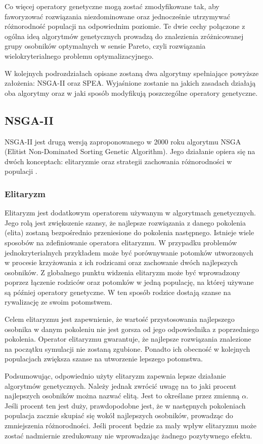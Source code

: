 \documentclass[twoside]{iisthesis}
\begin{document}
Co więcej operatory genetyczne mogą zostać zmodyfikowane tak, aby faworyzować rozwiązania niezdominowane oraz jednocześnie utrzymywać różnorodność populacji na odpowiednim poziomie. Te dwie cechy połączone z ogólna ideą algorytmów genetycznych prowadzą do znalezienia zróżnicowanej grupy osobników optymalnych w sensie Pareto, czyli rozwiązania wielokryterialnego problemu optymalizacyjnego.

W kolejnych podrozdziałach opisane zostaną dwa algorytmy spełniające powyższe założenia: NSGA-II oraz SPEA. Wyjaśnione zostanie na jakich zasadach działają oba algorytmy oraz w jaki sposób modyfikują poszczególne operatory genetyczne.
\subsection{NSGA-II}
NSGA-II jest drugą wersją zaproponowanego w 2000 roku algorytmu NSGA (Elitist Non-Dominated Sorting Genetic Algorithm). Jego działanie opiera się na dwóch konceptach: elitaryzmie oraz strategii zachowania różnorodności w populacji \cite{nsga}. 

\subsubsection{Elitaryzm}
Elitaryzm jest dodatkowym operatorem używanym w algorytmach genetycznych. Jego rolą jest zwiększenie szansy, że najlepsze rozwiązania z danego pokolenia (elita) zostaną bezpośrednio przeniesione do pokolenia następnego. Istnieje wiele sposobów na zdefiniowanie operatora elitaryzmu. W przypadku problemów jednokryterialnych przykładem może być porównywanie potomków utworzonych w procesie krzyżowania z ich rodzicami oraz zachowanie dwóch najlepszych osobników. Z globalnego punktu widzenia elitaryzm może być wprowadzony poprzez łączenie rodziców oraz potomków w jedną populację, na której używane są później operatory genetyczne. W ten sposób rodzice dostają szanse na rywalizację ze swoim potomstwem.

Celem elitaryzmu jest zapewnienie, że wartość przystosowania najlepszego osobnika w danym pokoleniu nie jest gorsza od jego odpowiednika z poprzedniego pokolenia. Operator elitaryzmu gwarantuje, że najlepsze rozwiązania znalezione na początku symulacji nie zostaną zgubione. Ponadto ich obecność w kolejnych populacjach zwiększa szanse na utworzenie lepszego potomstwa. 

Podsumowując, odpowiednio użyty elitaryzm zapewnia lepsze działanie algorytmów genetycznych. Należy jednak zwrócić uwagę na to jaki procent najlepszych osobników można nazwać elitą. Jest to określane przez zmienną $\alpha$. Jeśli procent ten jest duży, prawdopodobne jest, że w następnych pokoleniach populacja zacznie skupiać się wokół najlepszych osobników, prowadząc do zmniejszenia różnorodności. Jeśli procent będzie za mały wpływ elitaryzmu może zostać nadmiernie zredukowany nie wprowadzając żadnego pozytywnego efektu.\\
\end{document}
